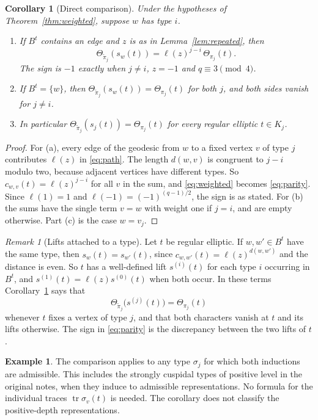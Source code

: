 \documentclass[12pt,letterpaper]{article}
\numberwithin{equation}{section}
\newtheorem{corollary}[theorem]{Corollary}
\theoremstyle{definition}
\newtheorem{example}[theorem]{Example}
\theoremstyle{remark}
\newtheorem{remark}[theorem]{Remark}
\newcommand{\tr}{\operatorname{tr}}
\begin{document}
\begin{corollary}[Direct comparison]\label{cor:compare}
Under the hypotheses of Theorem~\ref{thm:weighted}, suppose $w$ has type $i$.
\begin{enumerate}[label=(\alph*),leftmargin=2.2em]
\item If $B^t$ contains an edge and $z$ is as in Lemma~\ref{lem:repeated}, then
\begin{equation}\label{eq:parity}
 \Theta_{\widetilde\pi_j}(s_w(t))
 =\ell(z)^{j-i}\,\Theta_{\pi_j}(t).
\end{equation}
The sign is $-1$ exactly when $j\ne i$, $z=-1$ and $q\equiv3\pmod4$.
\item If $B^t=\{w\}$, then $\Theta_{\widetilde\pi_j}(s_w(t))=\Theta_{\pi_j}(t)$ for both $j$, and both sides vanish for $j\ne i$.
\item In particular $\Theta_{\widetilde\pi_j}(s_j(t))=\Theta_{\pi_j}(t)$ for every regular elliptic $t\in K_j$.
\end{enumerate}
\end{corollary}
\begin{proof}
For (a), every edge of the geodesic from $w$ to a fixed vertex $v$ of type $j$ contributes $\ell(z)$ in \eqref{eq:path}. The length $d(w,v)$ is congruent to $j-i$ modulo two, because adjacent vertices have different types. So $c_{w,v}(t)=\ell(z)^{j-i}$ for all $v$ in the sum, and \eqref{eq:weighted} becomes \eqref{eq:parity}. Since $\ell(1)=1$ and $\ell(-1)=(-1)^{(q-1)/2}$, the sign is as stated. For (b) the sums have the single term $v=w$ with weight one if $j=i$, and are empty otherwise. Part (c) is the case $w=v_j$.
\end{proof}

\begin{remark}[Lifts attached to a type]\label{rem:lifts}
Let $t$ be regular elliptic. If $w,w'\in B^t$ have the same type, then $s_w(t)=s_{w'}(t)$, since $c_{w,w'}(t)=\ell(z)^{d(w,w')}$ and the distance is even. So $t$ has a well-defined lift $s^{(i)}(t)$ for each type $i$ occurring in $B^t$, and $s^{(1)}(t)=\ell(z)s^{(0)}(t)$ when both occur. In these terms Corollary~\ref{cor:compare} says that
\[
 \Theta_{\widetilde\pi_j}\bigl(s^{(j)}(t)\bigr)=\Theta_{\pi_j}(t)
\]
whenever $t$ fixes a vertex of type $j$, and that both characters vanish at $t$ and its lifts otherwise. The sign in \eqref{eq:parity} is the discrepancy between the two lifts of $t$.
\end{remark}

\begin{example}
The comparison applies to any type $\sigma_j$ for which both inductions are admissible. This includes the strongly cuspidal types of positive level in the original notes, when they induce to admissible representations. No formula for the individual traces $\tr\sigma_v(t)$ is needed. The corollary does not classify the positive-depth representations.
\end{example}
\end{document}
